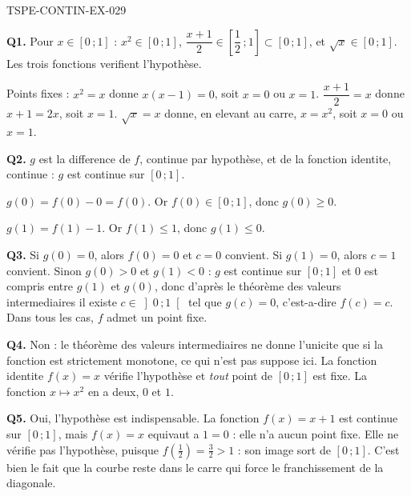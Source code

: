 \begin{corrige}{TSPE-CONTIN-EX-029}

\textbf{Q1.} Pour $x \in [0\,;1]$ : $x^2 \in [0\,;1]$, $\dfrac{x+1}{2} \in \left[\dfrac12\,;1\right] \subset [0\,;1]$, et $\sqrt{x} \in [0\,;1]$. Les trois fonctions verifient l'hypothèse.

Points fixes : $x^2 = x$ donne $x(x-1) = 0$, soit $x = 0$ ou $x = 1$. $\dfrac{x+1}{2} = x$ donne $x + 1 = 2x$, soit $x = 1$. $\sqrt{x} = x$ donne, en elevant au carre, $x = x^2$, soit $x = 0$ ou $x = 1$.

\textbf{Q2.} $g$ est la difference de $f$, continue par hypothèse, et de la fonction identite, continue : $g$ est continue sur $[0\,;1]$.

$g(0) = f(0) - 0 = f(0)$. Or $f(0) \in [0\,;1]$, donc $g(0) \geq 0$.

$g(1) = f(1) - 1$. Or $f(1) \leq 1$, donc $g(1) \leq 0$.

\textbf{Q3.} Si $g(0) = 0$, alors $f(0) = 0$ et $c = 0$ convient. Si $g(1) = 0$, alors $c = 1$ convient. Sinon $g(0) > 0$ et $g(1) < 0$ : $g$ est continue sur $[0\,;1]$ et $0$ est compris entre $g(1)$ et $g(0)$, donc d'après le théorème des valeurs intermediaires il existe $c \in \left]0\,;1\right[$ tel que $g(c) = 0$, c'est-a-dire $f(c) = c$. Dans tous les cas, $f$ admet un point fixe.

\textbf{Q4.} Non : le théorème des valeurs intermediaires ne donne l'unicite que si la fonction est strictement monotone, ce qui n'est pas suppose ici. La fonction identite $f(x) = x$ vérifie l'hypothèse et \emph{tout} point de $[0\,;1]$ est fixe. La fonction $x \mapsto x^2$ en a deux, $0$ et $1$.

\textbf{Q5.} Oui, l'hypothèse est indispensable. La fonction $f(x) = x + 1$ est continue sur $[0\,;1]$, mais $f(x) = x$ equivaut a $1 = 0$ : elle n'a aucun point fixe. Elle ne vérifie pas l'hypothèse, puisque $f\!\left(\tfrac12\right) = \tfrac32 > 1$ : son image sort de $[0\,;1]$. C'est bien le fait que la courbe reste dans le carre qui force le franchissement de la diagonale.
\end{corrige}
